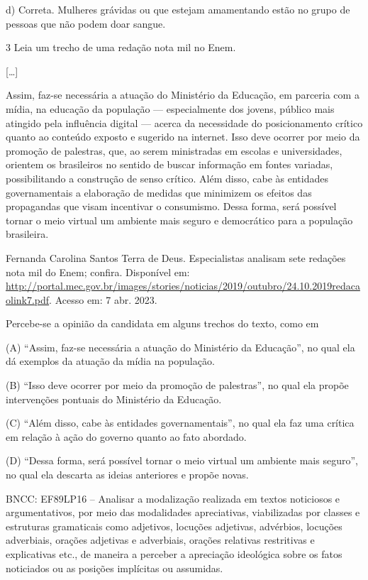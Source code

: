 \begin{itemize}
\begin{itemize}
{\begin{itemize}
\begin{itemize}
d) Correta. Mulheres grávidas ou que estejam amamentando estão no grupo
de pessoas que não podem doar sangue.

\num{3} Leia um trecho de uma redação nota mil no Enem.

{[}\ldots{}{]}

Assim, faz-se necessária a atuação do Ministério da Educação, em
parceria com a mídia, na educação da população --- especialmente dos
jovens, público mais atingido pela influência digital --- acerca da
necessidade do posicionamento crítico quanto ao conteúdo exposto e
sugerido na internet. Isso deve ocorrer por meio da promoção de
palestras, que, ao serem ministradas em escolas e universidades,
orientem os brasileiros no sentido de buscar informação em fontes
variadas, possibilitando a construção de senso crítico. Além disso, cabe
às entidades governamentais a elaboração de medidas que minimizem os
efeitos das propagandas que visam incentivar o consumismo. Dessa forma,
será possível tornar o meio virtual um ambiente mais seguro e
democrático para a população brasileira.

Fernanda Carolina Santos Terra de Deus. Especialistas analisam sete
redações nota mil do Enem; confira. Disponível em:
\url{http://portal.mec.gov.br/images/stories/noticias/2019/outubro/24.10.2019redacaolink7.pdf}.
Acesso em: 7 abr. 2023.

Percebe-se a opinião da candidata em alguns trechos do texto, como em

(A) ``Assim, faz-se necessária a atuação do Ministério da Educação'', no
qual ela dá exemplos da atuação da mídia na população.

(B) ``Isso deve ocorrer por meio da promoção de palestras'', no qual ela
propõe intervenções pontuais do Ministério da Educação.

(C) ``Além disso, cabe às entidades governamentais'', no qual ela faz
uma crítica em relação à ação do governo quanto ao fato abordado.

(D) ``Dessa forma, será possível tornar o meio virtual um ambiente mais
seguro'', no qual ela descarta as ideias anteriores e propõe novas.

BNCC: EF89LP16 -- Analisar a modalização realizada em textos noticiosos
e argumentativos, por meio das modalidades apreciativas, viabilizadas
por classes e estruturas gramaticais como adjetivos, locuções adjetivas,
advérbios, locuções adverbiais, orações adjetivas e adverbiais, orações
relativas restritivas e explicativas etc., de maneira a perceber a
apreciação ideológica sobre os fatos noticiados ou as posições
implícitas ou assumidas.


\end{itemize}
\end{itemize}}
\end{itemize}
\end{itemize}

